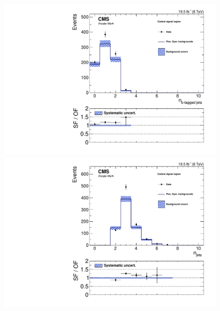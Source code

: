 \begin{figure}[htbp]
\centering
\begin{minipage}[t]{0.49\textwidth}
  \includegraphics[width=\textwidth]{plots/results/rSFOFDependencies/rSFOFDependency_SignalCentral_NBJets_Full2012_SF_lowMass.pdf}
\end{minipage}
\begin{minipage}[t]{0.49\textwidth}
\includegraphics[width=\textwidth]{plots/results/rSFOFDependencies/rSFOFDependency_SignalCentral_NJets_Full2012_SF_lowMass.pdf}
\end{minipage}
\begin{minipage}[t]{0.49\textwidth}

\end{minipage}
\end{figure}
